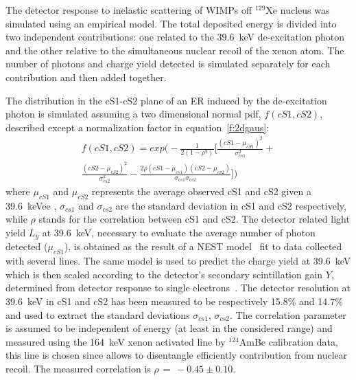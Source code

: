 The detector response to inelastic scattering of WIMPs  off $^{129}$Xe nucleus was simulated using an empirical model.
The total deposited energy is divided into two independent contributions: one related to the 39.6~keV de-excitation photon and the other  relative to
the simultaneous nuclear recoil of the xenon atom. The number of photons and charge yield detected is simulated separately for each contribution
and then added together.

The distribution in the cS1-cS2 plane of an ER induced by the de-excitation photon is simulated assuming a two dimensional normal pdf, $f(cS1,cS2)$, 
described except a normalization factor in equation~\ref{f:2dgaus}:
\begin{multline}
	f(cS1,cS2)  = exp \Big( -\frac{1}{2(1-\rho^2)} \Big[ \frac{(cS1 - \mu_{cS1})^2}{\sigma_{cs1}^2} + \\ 
	 \frac{(cS2 - \mu_{cS2})^2}{\sigma_{cs2}^2} - \frac{2\rho(cS1 - \mu_{cs1}) (cS2 - \mu_{cs2})} {\sigma_{cs1}\sigma_{cs2}} \Big] \Big) 
\label{f:2dgaus}
\end{multline}
where $\mu_{cS1}$ and $\mu_{cS2}$ 
represents the average observed cS1 and cS2 given a 39.6~keVee , $\sigma_{cs1}$ and $\sigma_{cs2}$ are the standard deviation in cS1 and cS2 respectively,
while $\rho$ stands for the correlation between cS1 and cS2.
The detector related light yield $L_y$  at 39.6~keV, necessary to evaluate the average number of photon detected ($\mu_{cS1}$),
is obtained as the result of a NEST model~\cite{NEST,Geant1,Geant2} fit to data collected with several lines.  The same model is used to predict the charge yield at
39.6~keV which is then scaled according to the detector's secondary scintillation gain $Y$, determined from detector response to single electrons~\cite{SingleE}.
The detector resolution at 39.6~keV in cS1 and cS2 has been measured to be respectively 15.8\% and 14.7\% and used to extract the standard 
deviations $\sigma_{cs1}$, $\sigma_{cs2}$.  The correlation parameter is assumed to be independent of energy (at least in the considered range) and measured
using the 164~keV xenon activated line by $^{124}$AmBe calibration data, this line is chosen since allows to disentangle efficiently contribution from nuclear recoil.
The measured correlation is $\rho \, = \, -0.45 \pm 0.10$. 


